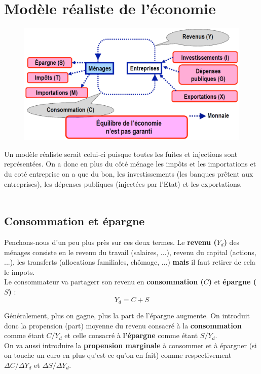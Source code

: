 \section{Modèle réaliste de l'économie}
\begin{figure}
\includegraphics[scale=0.3]{54}
\end{figure}
Un modèle réaliste serait celui-ci puisque toutes les fuites et injections sont représentées. On a donc en plus du côté ménage les impôts et les importations et du coté entreprise on a que du bon, les investissements (les banques prêtent aux entreprises), les dépenses publiques (injectées par l'Etat) et les exportations. \\\\

\subsection{Consommation et épargne}
Penchons-nous d'un peu plus près sur ces deux termes. Le \textbf{revenu ($Y_d$)} des ménages consiste en le revenu du travail (salaires, ...), revenu du capital (actions, ...), les transferts (allocations familiales, chômage, ...) \textbf{mais} il faut retirer de cela le impots. \\
Le consommateur va partagerr son revenu en \textbf{consommation ($C$)} et \textbf{épargne ($S$)} : 
\begin{equation}
Y_d = C + S
\end{equation}

Généralement, plus on gagne, plus la part de l'épargne augmente. On introduit donc la propension (part) moyenne du revenu consacré à la \textbf{consommation} comme étant $C/Y_d$ et celle consacré à \textbf{l'épargne} comme étant $S/Y_d$. \\
On va aussi introduire la \textbf{propension marginale} à consommer et à épargner (si on touche un euro en plus qu'est ce qu'on en fait) comme respectivement $\Delta C/\Delta Y_d$ et $\Delta S/\Delta Y_d$.

